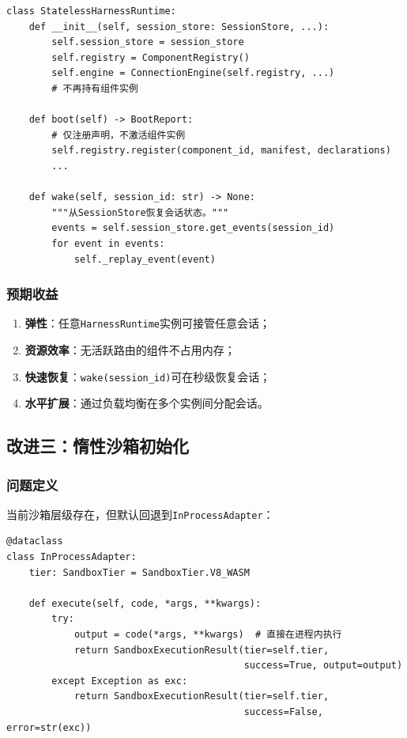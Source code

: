 \documentclass[12pt,a4paper]{ctexart}
\begin{document}
\begin{lstlisting}[caption={无状态HarnessRuntime示意}]
class StatelessHarnessRuntime:
    def __init__(self, session_store: SessionStore, ...):
        self.session_store = session_store
        self.registry = ComponentRegistry()
        self.engine = ConnectionEngine(self.registry, ...)
        # 不再持有组件实例

    def boot(self) -> BootReport:
        # 仅注册声明，不激活组件实例
        self.registry.register(component_id, manifest, declarations)
        ...

    def wake(self, session_id: str) -> None:
        """从SessionStore恢复会话状态。"""
        events = self.session_store.get_events(session_id)
        for event in events:
            self._replay_event(event)
\end{lstlisting}

\subsubsection{预期收益}

\begin{enumerate}
    \item \textbf{弹性}：任意\texttt{HarnessRuntime}实例可接管任意会话；
    \item \textbf{资源效率}：无活跃路由的组件不占用内存；
    \item \textbf{快速恢复}：\texttt{wake(session\_id)}可在秒级恢复会话；
    \item \textbf{水平扩展}：通过负载均衡在多个实例间分配会话。
\end{enumerate}

\subsection{改进三：惰性沙箱初始化}

\subsubsection{问题定义}

当前沙箱层级存在，但默认回退到\texttt{InProcessAdapter}：

\begin{lstlisting}[caption={当前进程内沙箱回退}]
@dataclass
class InProcessAdapter:
    tier: SandboxTier = SandboxTier.V8_WASM

    def execute(self, code, *args, **kwargs):
        try:
            output = code(*args, **kwargs)  # 直接在进程内执行
            return SandboxExecutionResult(tier=self.tier,
                                          success=True, output=output)
        except Exception as exc:
            return SandboxExecutionResult(tier=self.tier,
                                          success=False, error=str(exc))
\end{lstlisting}
\end{document}
